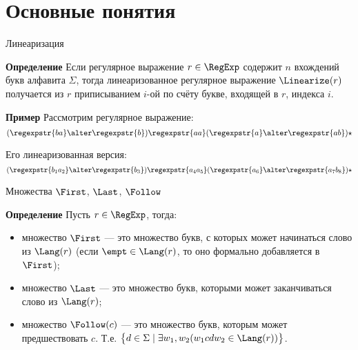 \section{Основные понятия}
\begin{frame}{Линеаризация}
    \begin{block}{\bf Определение}
        Если регулярное выражение $r\in\RegExp$ содержит $n$ вхождений букв алфавита $\Sigma$, тогда линеаризованное регулярное выражение $\Linearize(r)$ получается из $r$ приписыванием $i$-ой по счёту букве, входящей в $r$, индекса $i$.
    \end{block} %

    \begin{exampleblock}{\bf Пример}
        Рассмотрим регулярное выражение:
        \[(\regexpstr{ba}\alter \regexpstr{b})\regexpstr{aa}(\regexpstr{a}\alter\regexpstr{ab})\star\] %

        Его линеаризованная версия:
        \[(\regexpstr{b_{1}a_{2}}\alter \regexpstr{b_{3}})\regexpstr{a_{4}a_{5}}(\regexpstr{a_{6}}\alter\regexpstr{a_{7}b_{8}})\star\] %

    \end{exampleblock}

\end{frame}

\begin{frame}{Множества $\First$, $\Last$, $\Follow$}
    \vspace{-5pt}
    \begin{block}{\bf Определение}
        Пусть $r\in\RegExp$, тогда:
        \begin{itemize}
            \item множество $\First$ --- это множество букв, с которых может начинаться слово из $\Lang(r)$ (если $\empt\in\Lang(r)$, то оно формально добавляется в $\First$);
            \item множество $\Last$ --- это множество букв, которыми может заканчиваться слово из $\Lang(r)$;
            \item множество $\Follow(c)$ --- это множество букв, которым может предшествовать $c$. Т.е. $\bigl\lbrace d\in\Sigma\mid \exists w_1,w_2(w_1 c d w_2\in\Lang(r))\bigr\rbrace$.
        \end{itemize}
    \end{block} %
\end{frame}

